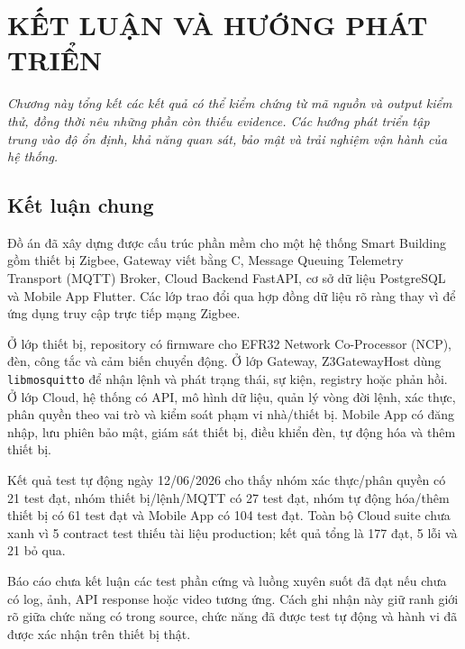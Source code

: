 \chapter{KẾT LUẬN VÀ HƯỚNG PHÁT TRIỂN}
\label{ch:ketluan}

\vspace{0.5cm}
\noindent\textit{Chương này tổng kết các kết quả có thể kiểm chứng từ mã nguồn và output kiểm thử, đồng thời nêu những phần còn thiếu evidence. Các hướng phát triển tập trung vào độ ổn định, khả năng quan sát, bảo mật và trải nghiệm vận hành của hệ thống.}
\vspace{0.5cm}

\section{Kết luận chung}
\label{sec:ch6-conclusion}

Đồ án đã xây dựng được cấu trúc phần mềm cho một hệ thống Smart Building gồm thiết bị Zigbee, Gateway viết bằng C, Message Queuing Telemetry Transport (MQTT) Broker, Cloud Backend FastAPI, cơ sở dữ liệu PostgreSQL và Mobile App Flutter. Các lớp trao đổi qua hợp đồng dữ liệu rõ ràng thay vì để ứng dụng truy cập trực tiếp mạng Zigbee.

Ở lớp thiết bị, repository có firmware cho EFR32 Network Co-Processor (NCP), đèn, công tắc và cảm biến chuyển động. Ở lớp Gateway, Z3GatewayHost dùng \texttt{libmosquitto} để nhận lệnh và phát trạng thái, sự kiện, registry hoặc phản hồi. Ở lớp Cloud, hệ thống có API, mô hình dữ liệu, quản lý vòng đời lệnh, xác thực, phân quyền theo vai trò và kiểm soát phạm vi nhà/thiết bị. Mobile App có đăng nhập, lưu phiên bảo mật, giám sát thiết bị, điều khiển đèn, tự động hóa và thêm thiết bị.

Kết quả test tự động ngày 12/06/2026 cho thấy nhóm xác thực/phân quyền có 21 test đạt, nhóm thiết bị/lệnh/MQTT có 27 test đạt, nhóm tự động hóa/thêm thiết bị có 61 test đạt và Mobile App có 104 test đạt. Toàn bộ Cloud suite chưa xanh vì 5 contract test thiếu tài liệu production; kết quả tổng là 177 đạt, 5 lỗi và 21 bỏ qua.

Báo cáo chưa kết luận các test phần cứng và luồng xuyên suốt đã đạt nếu chưa có log, ảnh, API response hoặc video tương ứng. Cách ghi nhận này giữ ranh giới rõ giữa chức năng có trong source, chức năng đã được test tự động và hành vi đã được xác nhận trên thiết bị thật.

